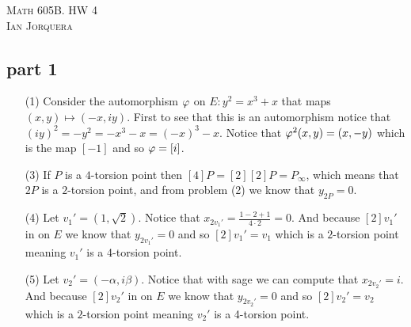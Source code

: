 \documentclass[12pt]{amsart}
\begin{document}
\begin{center}
    \textsc{Math 605B. HW 4\\ Ian Jorquera}
\end{center}
\vspace{1em}

\subsection*{part 1}
\begin{itemize}
\item[(1)] Consider the automorphism $\oldphi$ on $E:y^2=x^3+x$ that maps $(x,y)\mapsto (-x,iy)$. First to see that this is an automorphism notice that $(iy)^2=-y^2=-x^3-x=(-x)^3-x$. Notice that $\oldphi^2(x,y)=(x,-y)$ which is the map $[-1]$ and so $\oldphi=[i]$.\\

\item[(3)] If $P$ is a $4$-torsion point then $[4]P=[2][2]P=P_\infty$, which means that $2P$ is a $2$-torsion point, and from problem (2) we know that $y_{2P}=0$.

\item[(4)] Let $v_1'=(1,\sqrt{2})$. Notice that $x_{2v_1'}=\frac{1-2+1}{4\cdot 2}=0$. And because $[2]v_1'$ in on $E$ we know that $y_{2v_1'}=0$ and so $[2]v_1'=v_1$ which is a $2$-torsion point meaning $v_1'$ is a 4-torsion point.\\

\item[(5)] Let $v_2'=(-\alpha,i\beta)$. Notice that with sage we can compute that $x_{2v_2'}=i$. And because $[2]v_2'$ in on $E$ we know that $y_{2v_2'}=0$ and so $[2]v_2'=v_2$ which is a $2$-torsion point meaning $v_2'$ is a 4-torsion point.\\

\end{itemize}
\end{document}
